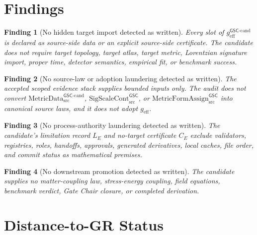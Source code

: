 \documentclass[11pt]{article}
\newcommand{\MetricDataCand}{\mathrm{MetricData}^{\mathsf{GSC}\mbox{-}\mathrm{cand}}_{\mathrm{src}}}
\newcommand{\SigScaleCont}{\mathrm{SigScaleCont}^{\mathsf{GSC}}_{\mathrm{src}}}
\newcommand{\MetricFormAssign}{\mathrm{MetricFormAssign}^{\mathsf{GSC}}_{\mathrm{src}}}
\newcommand{\geff}{g_{\mathrm{eff}}}
\newcommand{\geffCand}{g_{\mathrm{eff}}^{\mathsf{GSC}\mbox{-}\mathrm{cand}}}
\newtheorem{finding}{Finding}
\begin{document}
\section{Findings}

\begin{finding}[No hidden target import detected as written]
Every slot of \(\geffCand\) is declared as source-side data or an explicit
source-side certificate. The candidate does not require target topology, target
atlas, target metric, Lorentzian signature import, proper time, detector
semantics, empirical fit, or benchmark success.
\end{finding}

\begin{finding}[No source-law or adoption laundering detected as written]
The accepted scoped evidence stack supplies bounded inputs only. The audit
does not convert \(\MetricDataCand\), \(\SigScaleCont\), or
\(\MetricFormAssign\) into canonical source laws, and it does not adopt
\(\geff\).
\end{finding}

\begin{finding}[No process-authority laundering detected as written]
The candidate's limitation record \(L_E\) and no-target certificate \(C_E\)
exclude validators, registries, roles, handoffs, approvals, generated
derivatives, local caches, file order, and commit status as mathematical
premises.
\end{finding}

\begin{finding}[No downstream promotion detected as written]
The candidate supplies no matter-coupling law, stress-energy coupling, field
equations, benchmark verdict, Gate Chair closure, or completed derivation.
\end{finding}

\section{Distance-to-GR Status}
\end{document}
